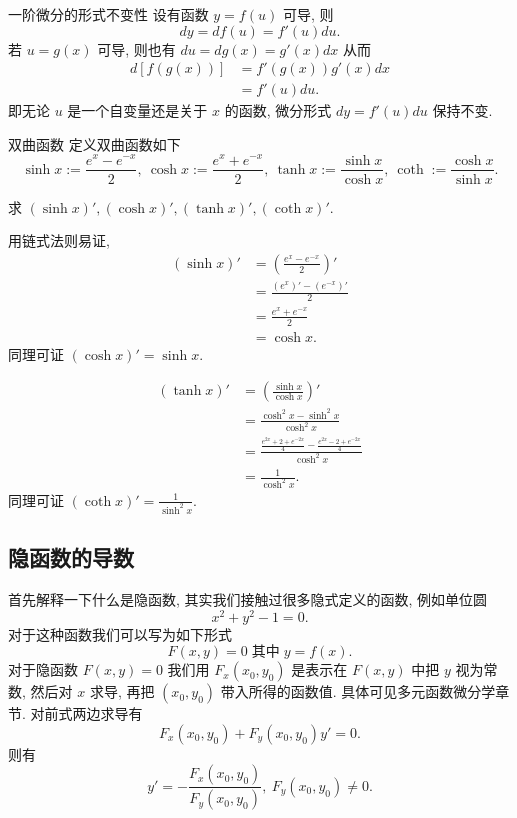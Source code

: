 \documentclass[cn,toc=twocol]{elegantbook}
\begin{document}
\begin{corollary}{一阶微分的形式不变性}
设有函数 $y = f(u)$ 可导, 则
\[
	dy = df(u) = f'(u)du.
\]
若 $u = g(x)$ 可导, 则也有 $du = dg(x) = g'(x)dx$ 从而
\[
\begin{aligned}
	d[f(g(x))] &= f'(g(x)) g'(x) dx\\
	&= f'(u) du.
\end{aligned}
\]
即无论 $u$ 是一个自变量还是关于 $x$ 的函数, 微分形式 $dy = f'(u) du$ 保持不变.	
\end{corollary}

\vspace{0.5em}

\begin{definition}{双曲函数}
	定义双曲函数如下
	\[
		\sinh x := \frac{e^x - e^{-x}}{2},\ \cosh x := \frac{e^x + e^{-x}}{2},\ \tanh x := \frac{\sinh x}{\cosh x},\ \coth := \frac{\cosh x}{\sinh x}.
	\]
\end{definition}

\begin{example}
	求 $(\sinh x)',(\cosh x)',(\tanh x)',(\coth x)'$.
\end{example}
\begin{solution}
	用链式法则易证,
	\[
	\begin{aligned}
		(\sinh x)' &= \left(\frac{e^x - e^{-x}}{2}\right)'\\
		&= \frac{\left(e^x\right)' - \left(e^{-x}\right)'}{2}\\
		&= \frac{e^x + e^{-x}}{2}\\
		&= \cosh x.
	\end{aligned}
	\]
	同理可证 $(\cosh x)' = \sinh x$.
	
	\[
	\begin{aligned}
		(\tanh x)' &= \left(\frac{\sinh x}{\cosh x}\right)'\\
		&= \frac{\cosh^2 x - \sinh^2 x}{\cosh^2 x}\\
		&= \frac{\frac{e^{2x} + 2 + e^{-2x}}{4} - \frac{e^{2x} - 2 + e^{-2x}}{4}}{\cosh^2 x}\\
		&= \frac{1}{\cosh^2 x}.
	\end{aligned}
	\]
	同理可证 $(\coth x)' = \frac{1}{\sinh^2 x}$.
\end{solution}

\subsection{隐函数的导数}

首先解释一下什么是隐函数, 其实我们接触过很多隐式定义的函数, 例如单位圆
\[
	x^2 + y^2 - 1 = 0.
\]
对于这种函数我们可以写为如下形式
\[
	F(x,y) = 0\; \text{其中}\; y = f(x).
\]
对于隐函数 $F(x,y) = 0$ 我们用 $F_x(x_0, y_0)$ 是表示在 $F(x,y)$ 中把 $y$ 视为常数, 然后对 $x$ 求导, 再把 $(x_0,y_0)$ 带入所得的函数值. 具体可见多元函数微分学章节. %
对前式两边求导有
\[
	F_x(x_0,y_0) + F_y(x_0,y_0) y' = 0.
\]
则有
\[
	y' = -\frac{F_x(x_0,y_0)}{F_y(x_0,y_0)},\ F_y(x_0,y_0) \neq 0.
\]
\end{document}
